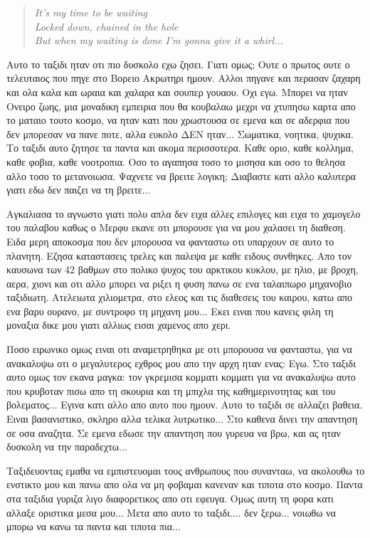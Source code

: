 \documentclass[11pt, letterpaper]{book}
\begin{document}
\begin{verse}
\textit{It's my time to be waiting\\
Locked down, chained in the hole\\
But when my waiting is done I'm gonna give it a whirl...}\\
\end{verse}

Αυτο το ταξιδι ηταν οτι πιο δυσκολο εχω ζησει. Γιατι ομως; Ουτε ο πρωτος ουτε ο τελευταιος που πηγε στο Βορειο Ακρωτηρι ημουν.
Αλλοι πηγανε και περασαν ζαχαρη και ολα καλα και ωραια και χαλαρα και σουπερ γουαου.
Οχι εγω. Μπορει να ηταν Ονειρο ζωης, μια μοναδικη εμπειρια που θα κουβαλαω μεχρι να χτυπησω καρτα απο το ματαιο τουτο κοσμο, να ηταν κατι που χρωστουσα σε εμενα και σε αδερφια που δεν μπορεσαν να πανε ποτε, αλλα ευκολο ΔΕΝ ηταν...
Σωματικα, νοητικα, ψυχικα. Το ταξιδι αυτο ζητησε τα παντα και ακομα περισσοτερα. Καθε οριο, καθε κολλημα, καθε φοβια, καθε νοοτροπια. Οσο το αγαπησα τοσο το μισησα και οσο το θελησα αλλο τοσο το μετανοιωσα. Ψαχνετε να βρειτε λογικη; Διαβαστε κατι αλλο καλυτερα γιατι εδω δεν παιζει να τη βρειτε...

Αγκαλιασα το αγνωστο γιατι πολυ απλα δεν ειχα αλλες επιλογες και ειχα το χαμογελο του παλαβου καθως ο Μερφυ εκανε οτι μπορουσε για να μου χαλασει τη διαθεση.
Ειδα μερη αποκοσμα που δεν μπορουσα να φανταστω οτι υπαρχουν σε αυτο το πλανητη.
Εζησα καταστασεις τρελες και παλεψα με καθε ειδους συνθηκες. Απο τον καυσωνα των 42 βαθμων στο πολικο ψυχος του αρκτικου κυκλου, με ηλιο, με βροχη, αερα, χιονι και οτι αλλο μπορει να ριξει η φυση πανω σε ενα ταλαιπωρο μηχανοβιο ταξιδιωτη.
Ατελειωτα χιλιομετρα, στο ελεος και τις διαθεσεις του καιρου, κατω απο ενα βαρυ ουρανο, με συντροφο τη μηχανη μου... Εκει ειναι που κανεις φιλη τη μοναξια δικε μου γιατι αλλιως εισαι χαμενος απο χερι.

Ποσο ειρωνικο ομως ειναι οτι αναμετρηθηκα με οτι μπορουσα να φανταστω, για να ανακαλυψω οτι ο μεγαλυτερος εχθρος μου απο την αρχη ηταν ενας: Εγω.
Στο ταξιδι αυτο ομως τον εκανα μαγκα: τον γκρεμισα κομματι κομματι για να ανακαλυψω αυτο που κρυβοταν πισω απο τη σκουρια και τη μπιχλα της καθημερινοτητας και του βολεματος... Εγινα κατι αλλο απο αυτο που ημουν. Αυτο το ταξιδι σε αλλαζει βαθεια. Ειναι βασανιστικο, σκληρο αλλα τελικα λυτρωτικο...
Στο καθενα δινει την απαντηση σε οσα αναζητα. Σε εμενα εδωσε την απαντηση που γυρευα να βρω, και ας ηταν δυσκολη να την παραδεχτω...

Ταξιδευοντας εμαθα να εμπιστευομαι τους ανθρωπους που συνανταω, να ακολουθω το ενστικτο μου και πανω απο ολα να μη φοβαμαι κανεναν και τιποτα στο κοσμο. Παντα στα ταξιδια γυριζα λιγο διαφορετικος απο οτι εφευγα. 
Ομως αυτη τη φορα κατι αλλαξε οριστικα μεσα μου...
Μετα απο αυτο το ταξιδι.... δεν ξερω... νοιωθω να μπορω να κανω τα παντα και τιποτα πια...
\end{document}
